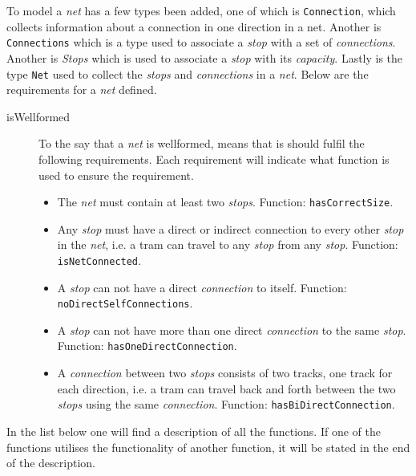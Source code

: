 \documentclass[a4]{article}
\begin{document}
\noindent To model a \emph{net} has a few types been added, one of which is \verb=Connection=, which collects information about a connection in one direction in a net. Another is \verb=Connections= which is a type used to associate a \emph{stop} with a set of \emph{connections}. Another is \emph{Stops} which is used to associate a \emph{stop} with its \emph{capacity}. Lastly is the type \verb=Net= used to collect the \emph{stops} and \emph{connections} in a \emph{net}.
Below are the requirements for a \emph{net} defined.
\\
\begin{description}
    \item[isWellformed] To the say that a \emph{net} is wellformed, means that is should fulfil the following requirements. Each requirement will indicate what function is used to ensure the requirement.
        \begin{itemize}
            \item The \emph{net} must contain at least two \emph{stops}. Function: \verb=hasCorrectSize=.
            \item Any \emph{stop} must have a direct or indirect connection to every other \emph{stop} in the \emph{net}, i.e. a tram can travel to any \emph{stop} from any \emph{stop}. Function: \verb=isNetConnected=.
            \item A \emph{stop} can not have a direct \emph{connection} to itself. Function: \verb=noDirectSelfConnections=.
            \item A \emph{stop} can not have more than one direct \emph{connection} to the same \emph{stop}. Function: \verb=hasOneDirectConnection=.
            \item A \emph{connection} between two \emph{stops} consists of two tracks, one track for each direction, i.e. a tram can travel back and forth between the two \emph{stops} using the same \emph{connection}. Function: \verb=hasBiDirectConnection=.
        \end{itemize}
\end{description}

\noindent In the list below one will find a description of all the functions. If one of the functions utilises the functionality of another function, it will be stated in the end of the description. \\
\end{document}
